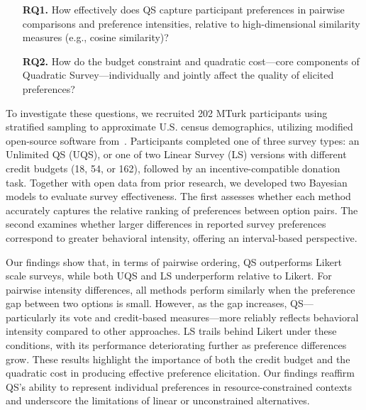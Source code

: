 \begin{itemize}
    \item [\textbf{RQ1.}] How effectively does QS capture participant preferences in pairwise comparisons and preference intensities, relative to high-dimensional similarity measures (e.g., cosine similarity)?
    \item [\textbf{RQ2.}] How do the budget constraint and quadratic cost---core components of Quadratic Survey---individually and jointly affect the quality of elicited preferences?
\end{itemize}


To investigate these questions, we recruited 202 MTurk participants using stratified sampling to approximate U.S. census demographics, utilizing modified open-source software from~\citet{chengCanShowWhat2021}. Participants completed one of three survey types: an Unlimited QS (UQS), or one of two Linear Survey (LS) versions with different credit budgets (18, 54, or 162), followed by an incentive-compatible donation task. Together with open data from prior research, we developed two Bayesian models to evaluate survey effectiveness. The first assesses whether each method accurately captures the relative ranking of preferences between option pairs. The second examines whether larger differences in reported survey preferences correspond to greater behavioral intensity, offering an interval-based perspective.

Our findings show that, in terms of pairwise ordering, QS outperforms Likert scale surveys, while both UQS and LS underperform relative to Likert. For pairwise intensity differences, all methods perform similarly when the preference gap between two options is small. However, as the gap increases, QS—particularly its vote and credit-based measures—more reliably reflects behavioral intensity compared to other approaches. LS trails behind Likert under these conditions, with its performance deteriorating further as preference differences grow. These results highlight the importance of both the credit budget and the quadratic cost in producing effective preference elicitation. Our findings reaffirm QS's ability to represent individual preferences in resource-constrained contexts and underscore the limitations of linear or unconstrained alternatives.


